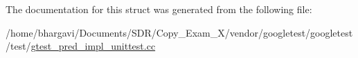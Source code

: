 The documentation for this struct was generated from the following file\+:\begin{DoxyCompactItemize}
\item 
/home/bhargavi/\+Documents/\+S\+D\+R/\+Copy\+\_\+\+Exam\+\_\+X/vendor/googletest/googletest/test/\hyperlink{gtest__pred__impl__unittest_8cc}{gtest\+\_\+pred\+\_\+impl\+\_\+unittest.\+cc}\end{DoxyCompactItemize}
